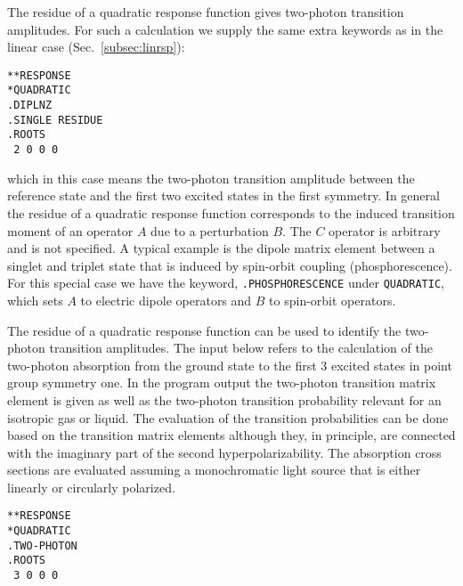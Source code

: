 The residue of a quadratic response function gives two-photon
transition amplitudes. For such a
calculation we supply the same extra 
keywords as in the linear case (Sec.~\ref{subsec:linrsp}):
\begin{verbatim}
**RESPONSE
*QUADRATIC
.DIPLNZ
.SINGLE RESIDUE
.ROOTS
 2 0 0 0
\end{verbatim}
which in this case means the two-photon transition
amplitude between the
reference state and the first two excited states in the first symmetry.  In
general the residue of a quadratic response function corresponds to the
induced transition moment of an operator $A$ due to a perturbation $B$.
The $C$ operator is arbitrary and is not specified.  A typical example is
the dipole matrix element between a singlet and triplet state that is
induced by spin-orbit coupling
(phosphorescence). For this special case we 
have the keyword, {\tt .PHOSPHORESCENCE} under {\tt *QUADRATIC}, which sets
$A$ to electric dipole operators and $B$ to spin-orbit operators.

The residue of a quadratic response function can be used to identify
the two-photon transition amplitudes. The input below refers to the
calculation of the two-photon absorption from the ground state to the
first 3 excited states in point group symmetry one. In the program
output the two-photon transition matrix element is given as well as
the two-photon transition probability relevant for an isotropic gas or
liquid. The evaluation of the transition probabilities can be done based
on the transition matrix elements although they, in principle, are
connected with the imaginary part of the second
hyperpolarizability. The absorption cross sections are evaluated
assuming a monochromatic light source that is either linearly or
circularly polarized.
\begin{verbatim}
**RESPONSE
*QUADRATIC
.TWO-PHOTON
.ROOTS
 3 0 0 0
\end{verbatim}

